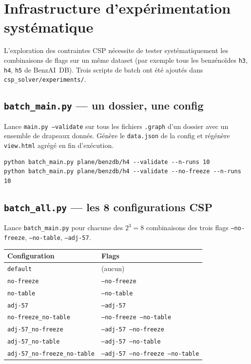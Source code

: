 \section{Infrastructure d'expérimentation systématique}

L'exploration des contraintes CSP nécessite de tester systématiquement les combinaisons de
flags sur un même dataset (par exemple tous les benzénoïdes \texttt{h3}, \texttt{h4},
\texttt{h5} de BenzAI~DB). Trois scripts de batch ont été ajoutés dans
\texttt{csp\_solver/experiments/}.

\subsection{\texttt{batch\_main.py} — un dossier, une config}

Lance \texttt{main.py --validate} sur tous les fichiers \texttt{.graph} d'un dossier avec un
ensemble de drapeaux donnés. Génère le \texttt{data.json} de la config et régénère
\texttt{view.html} agrégé en fin d'exécution.

\begin{lstlisting}[style=benzai]
python batch_main.py plane/benzdb/h4 --validate --n-runs 10
python batch_main.py plane/benzdb/h4 --validate --no-freeze --n-runs 10
\end{lstlisting}

\subsection{\texttt{batch\_all.py} — les 8 configurations CSP}

Lance \texttt{batch\_main.py} pour chacune des $2^3 = 8$ combinaisons des trois flags
\texttt{--no-freeze}, \texttt{--no-table}, \texttt{--adj-57}.

\begin{center}
\begin{tabular}{ll}
  \toprule
  Configuration & Flags \\
  \midrule
  \texttt{default}                       & (aucun) \\
  \texttt{no-freeze}                     & \texttt{--no-freeze} \\
  \texttt{no-table}                      & \texttt{--no-table} \\
  \texttt{adj-57}                        & \texttt{--adj-57} \\
  \texttt{no-freeze\_no-table}           & \texttt{--no-freeze --no-table} \\
  \texttt{adj-57\_no-freeze}             & \texttt{--adj-57 --no-freeze} \\
  \texttt{adj-57\_no-table}              & \texttt{--adj-57 --no-table} \\
  \texttt{adj-57\_no-freeze\_no-table}   & \texttt{--adj-57 --no-freeze --no-table} \\
  \bottomrule
\end{tabular}
\end{center}

